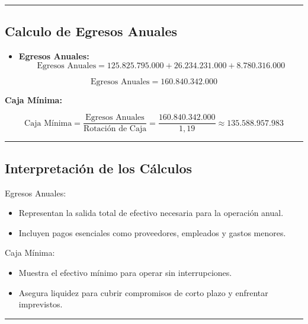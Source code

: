 \documentclass[
  letterpaper,
  DIV=11,
  numbers=noendperiod]{scrartcl}
\providecommand{\tightlist}{%
  \setlength{\itemsep}{0pt}\setlength{\parskip}{0pt}}\usepackage{longtable,booktabs,array}
\begin{document}
\begin{center}\rule{0.5\linewidth}{0.5pt}\end{center}

\subsection{Calculo de Egresos
Anuales}\label{calculo-de-egresos-anuales}

\begin{itemize}
\tightlist
\item
  \textbf{Egresos Anuales:} \[
  \text{Egresos Anuales} = 125.825.795.000 + 26.234.231.000 + 8.780.316.000
  \]
\end{itemize}

\[
\text{Egresos Anuales} = 160.840.342.000
\]

\textbf{Caja Mínima:}

\[
\text{Caja Mínima} = \frac{\text{Egresos Anuales}}{\text{Rotación de Caja}} = \frac{160.840.342.000}{1,19} \approx 135.588.957.983
\]

\begin{center}\rule{0.5\linewidth}{0.5pt}\end{center}

\subsection{Interpretación de los
Cálculos}\label{interpretaciuxf3n-de-los-cuxe1lculos}

Egresos Anuales:

\begin{itemize}
\tightlist
\item
  Representan la salida total de efectivo necesaria para la operación
  anual.
\item
  Incluyen pagos esenciales como proveedores, empleados y gastos
  menores.
\end{itemize}

Caja Mínima:

\begin{itemize}
\tightlist
\item
  Muestra el efectivo mínimo para operar sin interrupciones.
\item
  Asegura liquidez para cubrir compromisos de corto plazo y enfrentar
  imprevistos.
\end{itemize}

\begin{center}\rule{0.5\linewidth}{0.5pt}\end{center}
\end{document}
